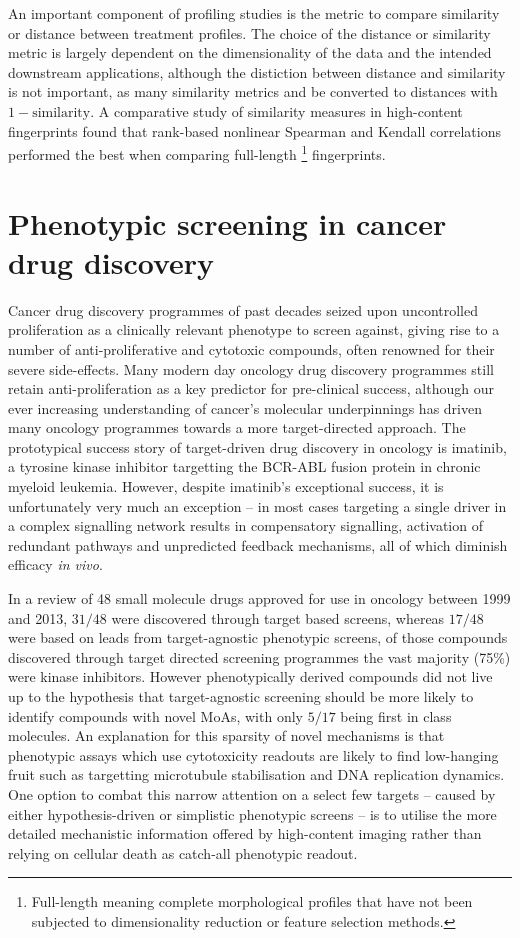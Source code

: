 \documentclass[a4paper,11pt,twoside,openright]{scrbook}
\begin{document}
An important component of profiling studies is the metric to compare similarity or distance between treatment profiles.
The choice of the distance or similarity metric is largely dependent on the dimensionality of the data and the intended downstream applications, although the distiction between distance and similarity is not important, as many similarity metrics and be converted to distances with $1 - \text{similarity}$.
A comparative study of similarity measures in high-content fingerprints found that rank-based nonlinear Spearman and Kendall correlations performed the best when comparing full-length
\footnote{Full-length meaning complete morphological profiles that have not been subjected to dimensionality reduction or feature selection methods.}
fingerprints. \cite{Reisen2013}


\section{Phenotypic screening in cancer drug discovery}
Cancer drug discovery programmes of past decades seized upon uncontrolled proliferation as a clinically relevant phenotype to screen against, giving rise to a number of anti-proliferative and cytotoxic compounds, often renowned for their severe side-effects.
Many modern day oncology drug discovery programmes still retain anti-proliferation as a key predictor for pre-clinical success, although our ever increasing understanding of cancer's molecular underpinnings has driven many oncology programmes towards a more target-directed approach.
The prototypical success story of target-driven drug discovery in oncology is imatinib, a tyrosine kinase inhibitor targetting the BCR-ABL fusion protein in chronic myeloid leukemia.
However, despite imatinib's exceptional success, it is unfortunately very much an exception -- in most cases targeting a single driver in a complex signalling network results in compensatory signalling, activation of redundant pathways and unpredicted feedback mechanisms, all of which diminish efficacy \textit{in vivo}.

In a review of 48 small molecule drugs approved for use in oncology between 1999 and 2013, $31/48$ were discovered through target based screens, whereas $17/48$ were based on leads from target-agnostic phenotypic screens, \cite{Moffat2014} of those compounds discovered through target directed screening programmes the vast majority (75\%) were kinase inhibitors.
However phenotypically derived compounds did not live up to the hypothesis that target-agnostic screening should be more likely to identify compounds with novel MoAs, \cite{Swinney2011} with only $5/17$ being first in class molecules.
An explanation for this sparsity of novel mechanisms is that phenotypic assays which use cytotoxicity readouts are likely to find low-hanging fruit such as targetting microtubule stabilisation and DNA replication dynamics. \cite{Moffat2014}
One option to combat this narrow attention on a select few targets -- caused by either hypothesis-driven or simplistic phenotypic screens -- is to utilise the more detailed mechanistic information offered by high-content imaging rather than relying on cellular death as catch-all phenotypic readout.
\end{document}
